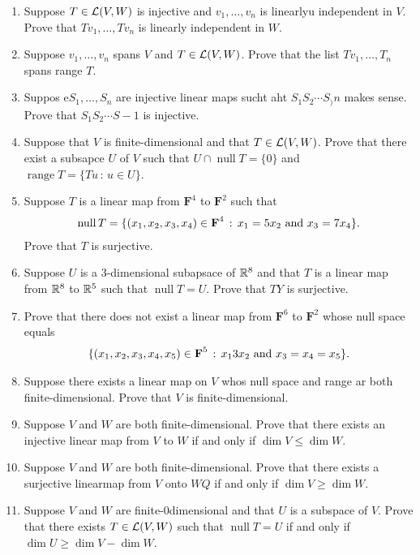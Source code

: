 \documentclass[10pt,a4paper]{report}
\DeclareMathOperator{\RANGE}{range}
\DeclareMathOperator{\NULL}{null}
\newcommand{\F}{\textbf{F}}
\begin{document}
\begin{enumerate}
\item Suppose $T \in\mathcal{L}(V,W)$ is injective and $v_1,\dots,v_n$ is linearlyu independent in $V$.  Prove that $Tv_1,\dots,Tv_n$ is linearly independent in $W$.

\item Suppose $v_1,\dots,v_n$ spans $V$ and $T \in \mathcal{L}(V,W)$.  Prove that the list $Tv_1,\dots,T_n$ spans range $T$.

\item Suppos e$S_1,\dots,S_n$ are injective linear maps sucht aht $S_1S_2\cdots  S_)n$ makes sense.  Prove that $S_1S_2\cdots S-1$ is injective.

\item Suppose that $V$ is finite-dimensional and that $T \in \mathcal{L}(V,W)$.  Prove that there exist a subsapce $U$ of $V$ such that $U \cap \NULL T = \{0\}$ and $\RANGE T=\{Tu\,:\,u\in U\}$.

\item Suppose $T$ is a linear map from $\F^4$ to $\F^2$ such that 
\begin{align*}
	\NULL T = \{(x_1,x_2,x_3,x_4)\in \F^4\,:\, x_1=5x_2\AND x_3=7x_4\}.
\end{align*}Prove that $T$ is surjective.

\item Suppose $U$ is a 3-dimensional subapsace of $\mathbb{R}^8$ and that $T$ is a linear map from $\mathbb{R}^8$ to $\mathbb{R}^5$ such that $\NULL T= U$.  Prove that $TY$ is surjective.

\item Prove that there does not exist a linear map from $\F^6$ to $\F^2$ whose null space equals
\begin{align*}
\{(x_1,x_2,x_3,x_4,x_5)\in \F^5\,:\,x_13x_2\AND x_3=x_4=x_5\}.
\end{align*}

\item Suppose there exists a linear map on $V$ whos null space and range ar both finite-dimensional.  Prove that $V$ is finite-dimensional.

\item Suppose $V$ and $W$ are both finite-dimensional.  Prove that there exists an injective linear map from $V$ to $W$ if and only if $\dim V \le \dim W$.

\item Suppose $V$ and $W$ are both finite-dimensional.  Prove that there exists a surjective linearmap from $V$ onto $WQ$ if and only if $\dim V \ge \dim W$.

\item Suppose $V$ and $W$ are finite-0dimensional and that $U$ is a subspace of $V$.  Prove that there exists $T \in \mathcal{L}(V,W)$ such that $\NULL T = U$ if and only if $\dim U \ge \dim V - \dim W$.


\end{enumerate}
\end{document}
